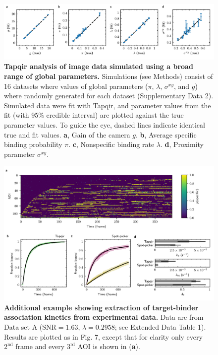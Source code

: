 \begin{figure}[h]
\centering
\includegraphics[width=\textwidth]{extended-data/figure3.png}
\caption{\textbf{Tapqir analysis of image data simulated using a broad range of global parameters.} Simulations (see Methods) consist of 16 datasets where values of global parameters ($\pi$, $\lambda$, $\sigma^{xy}$, and $g$) where randomly generated for each dataset (Supplementary Data 2). Simulated data were fit with Tapqir, and parameter values from the fit (with 95\% credible interval) are plotted against the true parameter values. To guide the eye, dashed lines  indicate identical true and fit values. \textbf{a}, Gain of the camera $g$. \textbf{b}, Average specific binding probability $\pi$. \textbf{c}, Nonspecific binding rate $\lambda$. \textbf{d}, Proximity parameter $\sigma^{xy}$. }
\label{fig:tapqir_global}
\end{figure}
\pagebreak

\begin{figure}[t]
\centering
\includegraphics[width=\textwidth]{extended-data/figure4.png}
\caption{\textbf{Additional example showing extraction of target-binder association kinetics from experimental data.} Data are from Data set A ($\mathrm{SNR} = 1.63$, $\lambda = 0.2958$; see Extended Data Table 1).  Results are plotted as in Fig. 7, except that for clarity only every $2^\mathrm{nd}$ frame and every $3^\mathrm{rd}$ AOI is shown in (\textbf{a}).}
\label{fig:rpb1snap549}
\end{figure}
\pagebreak

